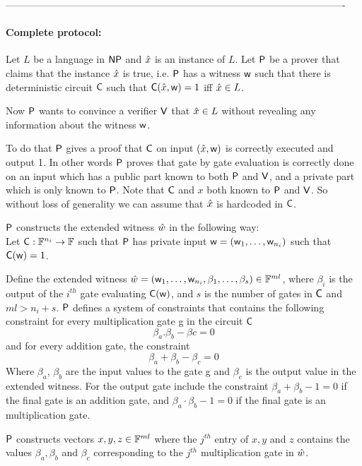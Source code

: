 -------------------------------------------------------------------------------------------------------

\paragraph{\textbf{Complete protocol:}} Let $L$ be a language in $\mathsf{NP}$ and $\hat{x}$ is an instance of $L$. Let $\mathsf{P}$ be a prover that claims that the instance $\hat{x}$ is true, i.e. $\mathsf{P}$ has a witness $\mathsf{w}$ such that there is deterministic circuit $\mathsf{C}$ such that $\mathsf{C}(\hat{x},\mathsf{w})=1$ iff $\hat{x} \in L$. 

Now $\mathsf{P}$ wants to convince a verifier $\mathsf{V}$ that $\hat{x}\in L$ without revealing any information about the witness $\mathsf{w}$. 

To do that $\mathsf{P}$ gives a proof that $\mathsf{C}$ on input $(\hat{x}, \mathsf{w})$ is correctly executed and output 1. In other words $\mathsf{P}$ proves that gate by gate evaluation is correctly done on an input which has a public part known to both $\mathsf{P}$ and $\mathsf{V}$, and a private part which is only known to $\mathsf{P}$. 
Note that $\mathsf{C}$ and $x$ both known to $\mathsf{P}$ and $\mathsf{V}$. So without loss of generality we can assume that $\hat{x}$ is hardcoded in $\mathsf{C}$.

$\mathsf{P}$ constructs the extended witness $\hat{w}$ in the following way: \\
Let $\mathsf{C}:\mathbb{F}^{n_i}\rightarrow \mathbb{F}$ such that $\mathsf{P}$ has private input $\mathsf{w} = (\mathsf{w}_1,\ldots, \mathsf{w}_{n_i})$ such that $\mathsf{C}(\mathsf{w})=1$.

Define the extended witness $\hat{w} = (\mathsf{w}_1,\ldots,\mathsf{w}_{n_i}, \beta_1,\ldots, \beta_s) \in \mathbb{F}^{ml}$, where $\beta_i$ is the output of the $i^{th}$ gate evaluating $\mathsf{C}(\mathsf{w})$, and $s$ is the number of gates in $\mathsf{C}$ and $ml>n_i + s$. $\mathsf{P}$ defines a system of constraints that contains the following constraint for every multiplication gate g in the circuit $\mathsf{C}$ $$\beta_{a}.\beta_{b}-\beta{c}=0$$
and for every addition gate, the constraint 
$$\beta_a + \beta_b - \beta_c = 0$$
Where $\beta_a$, $\beta_b$ are the input values to the gate g and $\beta_c$ is the output value in the extended witness. For the output gate include the constraint $\beta_a + \beta_b - 1 = 0$ if the final gate is an addition gate, and $\beta_a\cdot \beta_b - 1 = 0$ if the final gate is an multiplication gate. 

$\mathsf{P}$ constructs vectors $x,y,z \in \mathbb{F}^{ml}$ where the $j^{th}$ entry of $x,y$ and $z$ contains the values $\beta_a, \beta_b$ and $\beta_c$ corresponding to the $j^{th}$ multiplication gate in $\hat{w}$.

